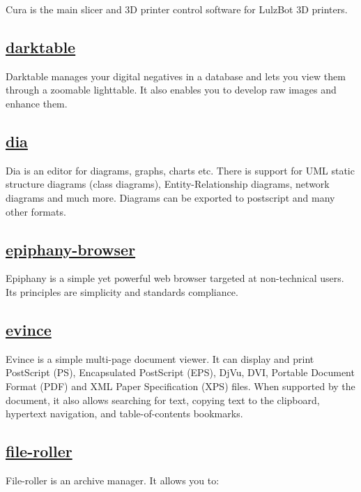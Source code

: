 Cura is the main slicer and 3D printer control software for LulzBot 3D
printers.

\subsection{\href{http://www.darktable.org/}{darktable}}

 Darktable manages your digital negatives in a database and lets you view
 them  through a zoomable lighttable. It also enables you to develop raw
 images and enhance them.
 
\subsection{\href{http://live.gnome.org/Dia}{dia}}

 Dia is an editor for diagrams, graphs, charts etc. There is support for UML
 static structure diagrams (class diagrams), Entity-Relationship diagrams,
 network diagrams and much more. Diagrams can be exported to postscript and
 many other formats.

\subsection{\href{https://wiki.gnome.org/Apps/Web}{epiphany-browser}}

 Epiphany is a simple yet powerful web browser targeted at
 non-technical users. Its principles are simplicity and standards
 compliance.
 
\subsection{\href{https://wiki.gnome.org/Apps/Evince}{evince}}

 Evince is a simple multi-page document viewer.  It can display and print
 PostScript (PS), Encapsulated PostScript (EPS), DjVu, DVI, Portable
 Document Format (PDF) and XML Paper Specification (XPS) files.
 When supported by the document, it also allows searching for text,
 copying text to the clipboard, hypertext navigation, and
 table-of-contents bookmarks.

\subsection{\href{http://fileroller.sourceforge.net/}{file-roller}}

 File-roller is an archive manager. It allows you to:

